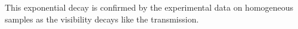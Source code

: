 This exponential decay is confirmed by the experimental data on homogeneous samples as the visibility decays like the transmission.